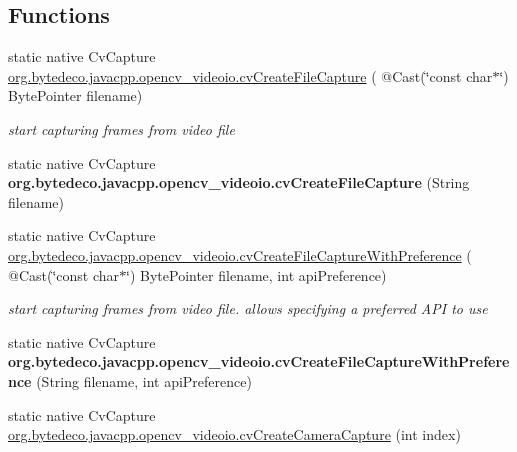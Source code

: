\subsection*{Functions}
\begin{DoxyCompactItemize}
\item 
\mbox{\label{group__videoio__c_gaf71dcb88fc0c7476076b298ed762ddca}} 
static native Cv\+Capture \hyperlink{group__videoio__c_gaf71dcb88fc0c7476076b298ed762ddca}{org.\+bytedeco.\+javacpp.\+opencv\+\_\+videoio.\+cv\+Create\+File\+Capture} ( @Cast(\char`\"{}const char$\ast$\char`\"{}) Byte\+Pointer filename)
\begin{DoxyCompactList}\small\item\em start capturing frames from video file \end{DoxyCompactList}\item 
\mbox{\label{group__videoio__c_ga2598a47214a513d1e674263995e40a0c}} 
static native Cv\+Capture {\bfseries org.\+bytedeco.\+javacpp.\+opencv\+\_\+videoio.\+cv\+Create\+File\+Capture} (String filename)
\item 
\mbox{\label{group__videoio__c_ga11789f0474ae978b9ec17590706f9901}} 
static native Cv\+Capture \hyperlink{group__videoio__c_ga11789f0474ae978b9ec17590706f9901}{org.\+bytedeco.\+javacpp.\+opencv\+\_\+videoio.\+cv\+Create\+File\+Capture\+With\+Preference} ( @Cast(\char`\"{}const char$\ast$\char`\"{}) Byte\+Pointer filename, int api\+Preference)
\begin{DoxyCompactList}\small\item\em start capturing frames from video file. allows specifying a preferred A\+PI to use \end{DoxyCompactList}\item 
\mbox{\label{group__videoio__c_gaf44956ff90d23e2ea6e6d7ba50d58726}} 
static native Cv\+Capture {\bfseries org.\+bytedeco.\+javacpp.\+opencv\+\_\+videoio.\+cv\+Create\+File\+Capture\+With\+Preference} (String filename, int api\+Preference)
\item 
\mbox{\label{group__videoio__c_ga43844b7ee876e73697163ae51ec617db}} 
static native Cv\+Capture \hyperlink{group__videoio__c_ga43844b7ee876e73697163ae51ec617db}{org.\+bytedeco.\+javacpp.\+opencv\+\_\+videoio.\+cv\+Create\+Camera\+Capture} (int index)

\end{DoxyCompactItemize}

